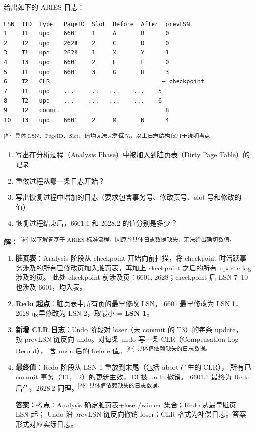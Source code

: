 \documentclass[11pt,a4paper]{article}
\newcommand{\solution}{\par\noindent\textcolor{ansblue}{\textbf{解：}}}
\newcommand{\answer}{\par\noindent\textcolor{ansred}{\textbf{答案：}}}
\newcommand{\supp}[1]{\textcolor{ansred}{\textsuperscript{[补] #1}}}
\begin{document}
给出如下的 ARIES 日志：

{\small
\begin{verbatim}
LSN  TID  Type   PageID  Slot  Before  After  prevLSN
1    T1   upd    6601    1     A       B      0
2    T2   upd    2628    2     C       D      0
3    T1   upd    2628    1     X       Y      1
4    T3   upd    6601    2     E       F      0
5    T1   upd    6601    3     G       H      3
6    T2   CLR                                ← checkpoint
7    T1   upd    ...    ...   ...    ...    5
8    T2   upd    ...    ...   ...    ...    6
9    T2   commit                              8
10   T3   upd    6601    2     M       N      4
\end{verbatim}}

\supp{具体 LSN、PageID、Slot、值均无法完整回忆，以上日志结构仅用于说明考点}

\begin{enumerate}[label=(\arabic*),leftmargin=*]
  \item 写出在分析过程（Analysis Phase）中被加入到脏页表（Dirty Page Table）的记录
  \item 重做过程从哪一条日志开始？
  \item 写出恢复过程中增加的日志（要求包含事务号、修改页号、slot 号和修改的值）
  \item 恢复过程结束后，6601.1 和 2628.2 的值分别是多少？
\end{enumerate}

\solution
\supp{以下解答基于 ARIES 标准流程，因原卷具体日志数据缺失，无法给出确切数值。}

\begin{enumerate}[label=(\arabic*),leftmargin=*]

  \item \textbf{脏页表}：Analysis 阶段从 checkpoint 开始向前扫描，将 checkpoint 时活跃事务涉及的所有已修改页加入脏页表，再加上 checkpoint 之后的所有 update log 涉及的页。
  此处 checkpoint 前涉及页：6601, 2628；checkpoint 后 LSN 7--10 也涉及 6601，均入表。

  \item \textbf{Redo 起点}：脏页表中所有页的最早修改 LSN。
  6601 最早修改为 LSN 1，2628 最早修改为 LSN 2，取最小 = \textbf{LSN 1}。

  \item \textbf{新增 CLR 日志}：Undo 阶段对 loser（未 commit 的 T3）的每条 update，
  按 prevLSN 链反向 undo。对每条 undo 写一条 CLR（Compensation Log Record），
  含 undo 后的 before 值。\supp{具体值依赖缺失的日志数据。}

  \item \textbf{最终值}：Redo 阶段从 LSN 1 重放到末尾（包括 abort 产生的 CLR），
  所有已 commit 事务（T1, T2）的更新生效，T3 被 undo 撤销。
  6601.1 最终为 Redo 后值，2628.2 同理。\supp{具体值依赖缺失的日志数据。}

  \answer 考点：Analysis 确定脏页表+loser/winner 集合；Redo 从最早脏页 LSN 起；
  Undo 沿 prevLSN 链反向撤销 loser；CLR 格式为补偿日志。答案形式对应实际日志。

\end{enumerate}
\end{document}
